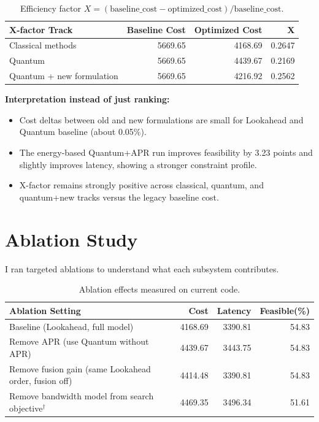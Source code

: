 \documentclass[11pt]{article}
\begin{document}
\begin{table}[h]
\centering
\begin{tabular}{lrrr}
\toprule
X-factor Track & Baseline Cost & Optimized Cost & X \\
\midrule
Classical methods & 5669.65 & 4168.69 & 0.2647 \\
Quantum & 5669.65 & 4439.67 & 0.2169 \\
Quantum + new formulation & 5669.65 & 4216.92 & 0.2562 \\
\bottomrule
\end{tabular}
\caption{Efficiency factor \(X = (\text{baseline\_cost} - \text{optimized\_cost})/\text{baseline\_cost}\).}
\end{table}

\textbf{Interpretation instead of just ranking:}
\begin{itemize}
    \item Cost deltas between old and new formulations are small for Lookahead and Quantum baseline (about 0.05\%).
    \item The energy-based Quantum+APR run improves feasibility by 3.23 points and slightly improves latency, showing a stronger constraint profile.
    \item X-factor remains strongly positive across classical, quantum, and quantum+new tracks versus the legacy baseline cost.
\end{itemize}

\section{Ablation Study}
I ran targeted ablations to understand what each subsystem contributes.

\begin{table}[h]
\centering
\begin{tabular}{lrrr}
\toprule
Ablation Setting & Cost & Latency & Feasible(\%) \\
\midrule
Baseline (Lookahead, full model) & 4168.69 & 3390.81 & 54.83 \\
Remove APR (use Quantum without APR) & 4439.67 & 3443.75 & 54.83 \\
Remove fusion gain (same Lookahead order, fusion off) & 4414.48 & 3390.81 & 54.83 \\
Remove bandwidth model from search objective$^\dagger$ & 4469.35 & 3496.34 & 51.61 \\
\bottomrule
\end{tabular}
\caption{Ablation effects measured on current code.}
\end{table}
\end{document}
